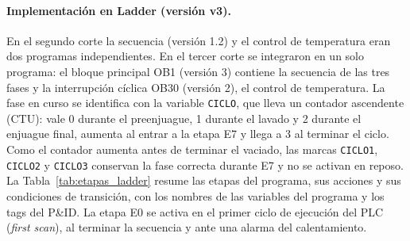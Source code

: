 \paragraph{Implementación en Ladder (versión v3).} En el segundo corte la secuencia (versión 1.2) y el control de temperatura eran dos programas independientes. En el tercer corte se integraron en un solo programa: el bloque principal OB1 (versión 3) contiene la secuencia de las tres fases y la interrupción cíclica OB30 (versión 2), el control de temperatura. La fase en curso se identifica con la variable \texttt{CICLO}, que lleva un contador ascendente (CTU): vale 0 durante el preenjuague, 1 durante el lavado y 2 durante el enjuague final, aumenta al entrar a la etapa E7 y llega a 3 al terminar el ciclo. Como el contador aumenta antes de terminar el vaciado, las marcas \texttt{CICLO1}, \texttt{CICLO2} y \texttt{CICLO3} conservan la fase correcta durante E7 y no se activan en reposo. La Tabla~\ref{tab:etapas_ladder} resume las etapas del programa, sus acciones y sus condiciones de transición, con los nombres de las variables del programa y los tags del P\&ID. La etapa E0 se activa en el primer ciclo de ejecución del PLC (\textit{first scan}), al terminar la secuencia y ante una alarma del calentamiento.

